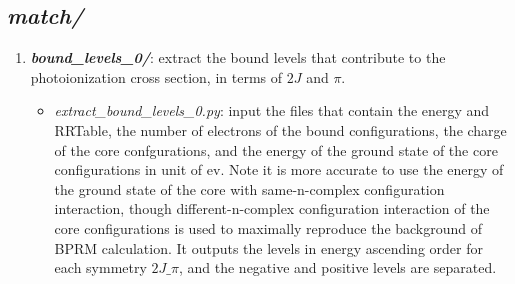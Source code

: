 \subsection{\textit{match/}}
\begin{enumerate}
	\item \textbf{\textit{bound\_levels\_0/}}: extract the bound levels that contribute to the photoionization cross section, in terms of $2J$ and $\pi$.
		\begin{itemize}
			\item \textit{extract\_bound\_levels\_0.py}: input the files that contain the energy and RRTable, the number of electrons of the bound configurations, the charge of the core confgurations, and the energy of the ground state of the core configurations in unit of ev. Note it is more accurate to use the energy of the ground state of the core with same-n-complex configuration interaction, though different-n-complex configuration interaction of the core configurations is used to maximally reproduce the background of BPRM calculation. It outputs the levels in energy ascending order for each symmetry $2J\_\pi$, and the negative and positive levels are separated.
		\end{itemize}
		

\end{enumerate}
